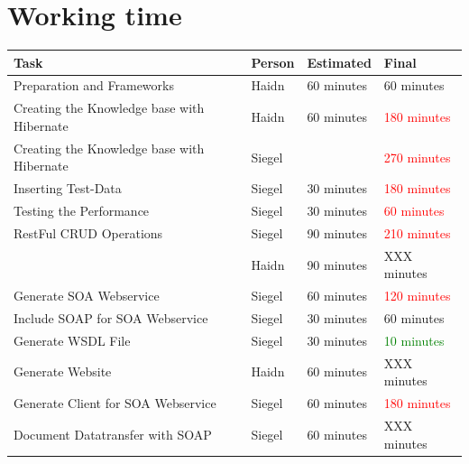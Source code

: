 \documentclass[12pt]{article}
\begin{document}
\section{Working time}
\begin{center}
\end{center}
\begin{table}[h]
\begin{tabular}{|p{}|p{}|p{}|p{}|}
\hline
\textbf{Task}    & \textbf{Person}   & \textbf{Estimated}  & \textbf{Final}\\ \hline \hline

Preparation and Frameworks & Haidn &  60 minutes & 60 minutes  \\ \hline 


Creating the Knowledge base with Hibernate & Haidn &  60   minutes & \textcolor{red}{180 minutes}
   \\ \hline 
   Creating the Knowledge base with Hibernate & Siegel &   & \textcolor{red}{270 minutes}
   \\  

Inserting Test-Data  & Siegel &  30 minutes  &   \textcolor{red}{180 minutes}  \\ \hline 

Testing the Performance  & Siegel &  30  minutes  &  \textcolor{red}{60  minutes}  \\ \hline 

RestFul CRUD Operations & Siegel &  90   minutes & \textcolor{red}{210 minutes} \\  
  & Haidn &  90 minutes  &  XXX   minutes  \\ \hline 


Generate SOA Webservice & Siegel &  60 minutes &  \textcolor{red}{120 minutes} \\ \hline 

Include SOAP for SOA Webservice & Siegel &  30 minutes &  60 minutes \\ \hline 
Generate WSDL File & Siegel &  30 minutes & \textcolor{green}{10 minutes}  \\ \hline 

Generate Website & Haidn &  60 minutes &  XXX minutes \\ \hline 

Generate Client for SOA Webservice & Siegel &  60 minutes & \textcolor{red}{180 minutes} \\ \hline 

Document Datatransfer with SOAP & Siegel &  60 minutes &  XXX minutes \\ \hline 


\end{tabular}
\end{table}
\end{document}
